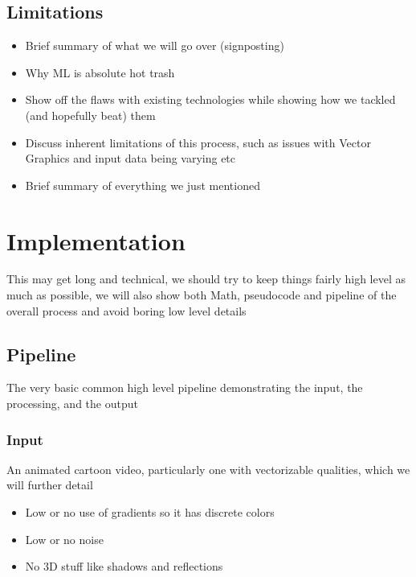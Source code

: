 \documentclass[12pt]{article}
\begin{document}
    \subsection{Limitations}

    \begin{itemize}
        \item Brief summary of what we will go over (signposting)
        \item Why ML is absolute hot trash
        \item Show off the flaws with existing technologies while showing how we tackled (and hopefully beat) them
        \item Discuss inherent limitations of this process, such as issues with Vector Graphics and input data being varying etc
        \item Brief summary of everything we just mentioned
    \end{itemize}

    \pagebreak


    \section{Implementation}

    This may get long and technical, we should try to keep things fairly high level as much as possible,
    we will also show both Math, pseudocode and pipeline of the overall process and avoid boring low level details

    \subsection{Pipeline}

    The very basic common high level pipeline demonstrating the input, the processing, and the output

    \subsubsection{Input}

    An animated cartoon video, particularly one with vectorizable qualities, which we will further detail
    \begin{itemize}
        \item Low or no use of gradients so it has discrete colors
        \item Low or no noise
        \item No 3D stuff like shadows and reflections
    \end{itemize}
\end{document}
